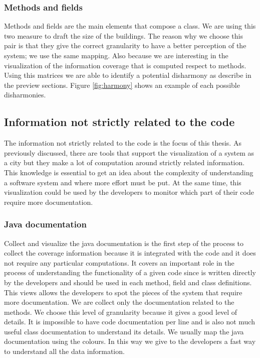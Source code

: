 \documentclass[]{usiinfbachelorproject}
\begin{document}
\subsubsection{Methods  and fields}



Methods and fields are the main elements that compose a class. We are using this two measure to draft the size of the buildings. The reason why we choose this pair is that they give the correct granularity to have a better perception of the system; \cite{Disharmony} \cite{vssac} we use the same mapping. Also because we are interesting in the visualization of the information coverage that is computed respect to  methods. 
Using this matrices we are able to  identify a potential disharmony as describe in the preview sections.
Figure \ref{fig:harmony}  shows an example of each possible disharmonies.
 


    
\newpage
\subsection{Information not strictly related to the code}
The information not strictly related to the code is the focus of this thesis. As previously discussed, there are tools that support the visualization of a system as a city but they make a lot of computation around strictly related information. This knowledge is essential to get an idea about the complexity of understanding a software system and where more effort must be put. At the same time, this visualization could be used by the developers to monitor which part of their code require more documentation.


\subsubsection{Java documentation}
Collect and visualize the java documentation is the first step of the process to collect the coverage information because it is integrated with the code and it does not require any particular computations. It covers an important role in the process of understanding the functionality of a given code since is written directly by the developers and should be used in each method, field and class definitions.
This views allows the developers to spot the pieces of the system that require more documentation. We are collect only the documentation related to the methods. We choose this level of granularity because it gives a good level of details. It is impossible to have code documentation per line and is also not much useful  class documentation to understand its details. 
We usually map the java documentation using the colours. In this way we give to the developers a fast way to understand all the data information. 
\end{document}
